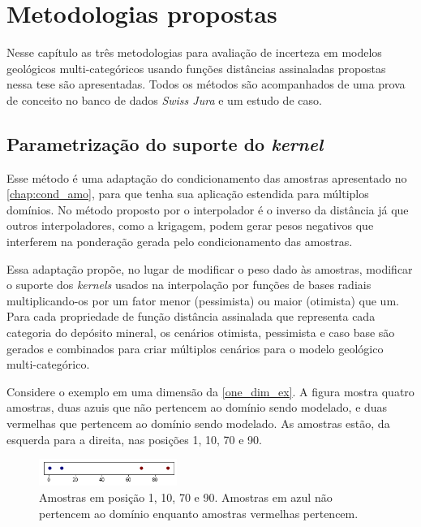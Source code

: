 \chapter{Metodologias propostas}\label{chap3}

Nesse capítulo as três metodologias para avaliação de incerteza em modelos geológicos multi-categóricos usando funções distâncias assinaladas propostas nessa tese são apresentadas. Todos os métodos são acompanhados de uma prova de conceito no banco de dados \textit{Swiss Jura} e um estudo de caso. 

\section{Parametrização do suporte do \textit{kernel}}\label{kernel_fac}

Esse método é uma adaptação do condicionamento das amostras apresentado no \autoref{chap:cond_amo}, para que tenha sua aplicação estendida para múltiplos domínios. No método proposto por  o interpolador é o inverso da distância já que outros interpoladores, como a krigagem, podem gerar pesos negativos que interferem na ponderação gerada pelo condicionamento das amostras.

Essa adaptação propõe, no lugar de modificar o peso dado às amostras, modificar o suporte dos \textit{kernels} usados na interpolação por funções de bases radiais multiplicando-os por um fator menor (pessimista) ou maior (otimista) que um. Para cada propriedade de função distância assinalada que representa cada categoria do depósito mineral, os cenários otimista, pessimista e caso base são gerados e combinados para criar múltiplos cenários para o modelo geológico multi-categórico.

Considere o exemplo em uma dimensão da \autoref{one_dim_ex}. A figura mostra quatro amostras, duas azuis que não pertencem ao domínio sendo modelado, e duas vermelhas que pertencem ao domínio sendo modelado. As amostras estão, da esquerda para a direita, nas posições 1, 10, 70 e 90.

\begin{figure}[H]
	\caption{\label{one_dim_ex} Amostras em posição 1, 10, 70 e 90. Amostras em azul não pertencem ao domínio enquanto amostras vermelhas pertencem.}
	\centering
		\includegraphics[width=0.4\textwidth]{capitulo_3/imagens/pointssd.png}
\end{figure}

